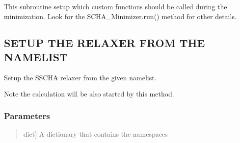 \documentclass[a4paper,11pt,english]{sphinxmanual}
\begin{document}
\begin{fulllineitems}
\begin{fulllineitems}
\label{\detokenize{apireference:sscha.Relax.SSCHA.setup_custom_functions}}
\pysigstartsignatures
{}
\pysigstopsignatures
\sphinxAtStartPar
This subroutine setup which custom functions should be called during the minimization.
Look for the SCHA\_Minimizer.run() method for other details.

\end{fulllineitems}


\begin{fulllineitems}
\label{\detokenize{apireference:sscha.Relax.SSCHA.setup_from_namelist}}
\pysigstartsignatures
{}
\pysigstopsignatures

\subsection{SETUP THE RELAXER FROM THE NAMELIST}
\label{\detokenize{apireference:setup-the-relaxer-from-the-namelist}}
\sphinxAtStartPar
Setup the SSCHA relaxer from the given namelist.

\sphinxAtStartPar
Note the calculation will be also started by this method.


\subsubsection{Parameters}
\label{\detokenize{apireference:id41}}\begin{quote}
\begin{description}
\sphinxlineitem{namelist}{[}dict{]}
\sphinxAtStartPar
A dictionary that contains the namespaces

\end{description}
\end{quote}

\end{fulllineitems}



\end{fulllineitems}
\end{document}
